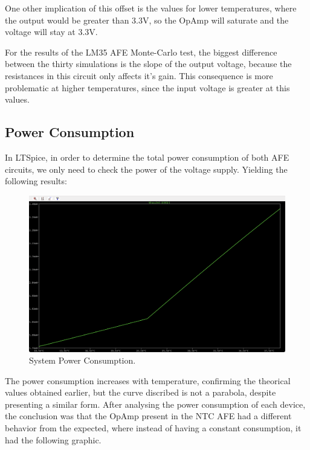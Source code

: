 \documentclass[12pt]{article}
\begin{document}
    One other implication of this offset is the values for lower temperatures, where the output would be greater than 3.3V, so the OpAmp will saturate and the voltage will stay at 3.3V.

    For the results of the LM35 AFE Monte-Carlo test, the biggest difference between the thirty simulations is the slope of the output voltage,
    because the resistances in this circuit only affects it's gain. This consequence is more problematic at higher temperatures, since the input voltage is greater at this values.

    \subsection{Power Consumption}
    
    In LTSpice, in order to determine the total power consumption of both AFE circuits, we only need to check the power of the voltage supply.
    Yielding the following results: 
        
    \begin{figure}[H] 
        \centering
        \includegraphics*[scale = 0.3]{images/PowerConsumption.png}
        \caption{System Power Consumption.}
        \label{wrap-fig:1}
    \end{figure}

    The power consumption increases with temperature, confirming the theorical values obtained earlier, but the curve discribed is not a parabola,
    despite presenting a similar form. After analysing the power consumption of each device, the conclusion was that the OpAmp present in the NTC AFE had a 
    different behavior from the expected, where instead of having a constant consumption, it had the following graphic.
 
\end{document}
